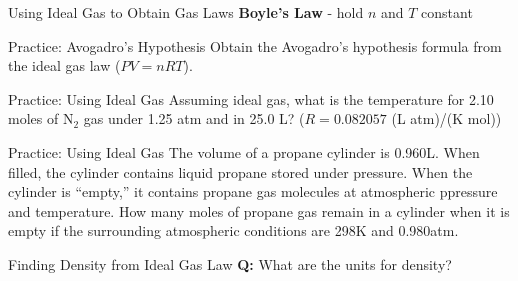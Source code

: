 \documentclass[11pt]{beamer}
\begin{document}
\begin{frame}{Using Ideal Gas to Obtain Gas Laws}
  \textbf{Boyle's Law} - hold $n$ and $T$ constant
\end{frame}

\begin{frame}{Practice: Avogadro's Hypothesis}
  Obtain the Avogadro's hypothesis formula from the ideal gas law
  ($PV = nRT$).
  \vspace{1in}
\end{frame}

\begin{frame}{Practice: Using Ideal Gas}
  Assuming ideal gas, what is the temperature for 2.10 moles of N$_2$ gas under
  1.25 atm and in 25.0 L? ($R=0.082057$ (L atm)/(K mol))
  \vspace{1in}
\end{frame}

\begin{frame}{Practice: Using Ideal Gas}
  The volume of a propane cylinder is 0.960L. When filled, the cylinder contains
  liquid propane stored under pressure. When the cylinder is ``empty,'' it contains
  propane gas molecules at atmospheric ppressure and temperature. How many
  moles of propane gas remain in a cylinder when it is empty if the surrounding
  atmospheric conditions are 298K and 0.980atm.
  \vspace{1.2in}
\end{frame}

\begin{frame}{Finding Density from Ideal Gas Law}
  \textbf{Q:} What are the units for density?
\end{frame}
\end{document}
